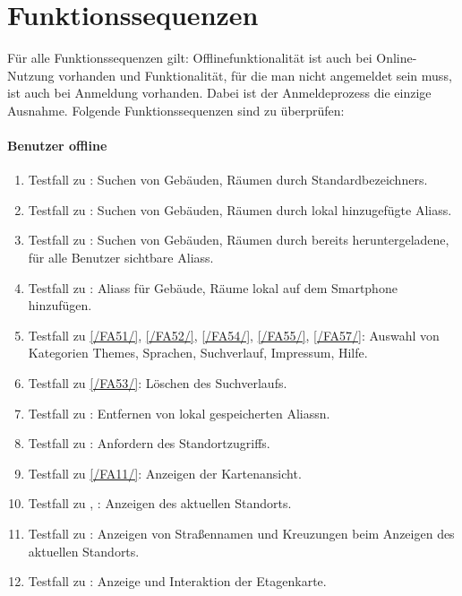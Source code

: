 \section{Funktionssequenzen}

Für alle Funktionssequenzen gilt:
Offlinefunktionalität ist auch bei Online-Nutzung vorhanden und Funktionalität, für die man nicht angemeldet sein muss, ist auch bei Anmeldung vorhanden. Dabei ist der Anmeldeprozess die einzige Ausnahme.
Folgende Funktionssequenzen sind zu überprüfen:

\paragraph{\Gls{Benutzer} offline}
\begin{enumerate}[label=\textbf{/T\arabic*0/}, align=left]
	\item \label{/T10/} Testfall zu : Suchen von Gebäuden, Räumen durch \Glspl{Standardbezeichner}.
	\item \label{/T20/} Testfall zu : Suchen von Gebäuden, Räumen durch \gls{lokal} hinzugefügte \Glspl{Alias}.
	\item \label{/T30/} Testfall zu : Suchen von Gebäuden, Räumen durch bereits heruntergeladene, für alle Benutzer sichtbare \Glspl{Alias}.
	\item \label{/T40/} Testfall zu : \Glspl{Alias} für Gebäude, Räume \gls{lokal} auf dem Smartphone hinzufügen.
	\item \label{/T50/} Testfall zu \ref{/FA51/}, \ref{/FA52/}, \ref{/FA54/}, \ref{/FA55/}, \ref{/FA57/}: Auswahl von Kategorien \Glspl{Theme}, Sprachen, Suchverlauf, Impressum, Hilfe.
	\item \label{/T60/} Testfall zu \ref{/FA53/}: Löschen des Suchverlaufs.
	\item \label{/T70/} Testfall zu : Entfernen von \gls{lokal} gespeicherten \Glspl{Alias}n.
	\item \label{/T80/} Testfall zu : Anfordern des Standortzugriffs.
	\item \label{/T90/} Testfall zu \ref{/FA11/}: Anzeigen der \Gls{Kartenansicht}.
	\item \label{/T100/} Testfall zu , : Anzeigen des aktuellen Standorts.
	\item \label{/T110/} Testfall zu : Anzeigen von Straßennamen und Kreuzungen beim Anzeigen des aktuellen Standorts.
	\item \label{/T120/} Testfall zu : Anzeige und Interaktion der \Gls{Etagenkarte}.

\end{enumerate}
